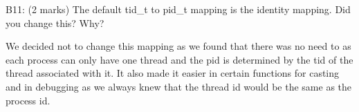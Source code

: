 
\noindent B11: (2 marks)
The default tid\_t to pid\_t mapping is the identity mapping.
Did you change this? Why?


We decided not to change this mapping as we found that there was no need to as each process can only have one thread and the pid is determined by the tid of the thread associated with it. It also made it easier in certain functions for casting and in debugging as we always knew that the thread id would be the same as the process id.
